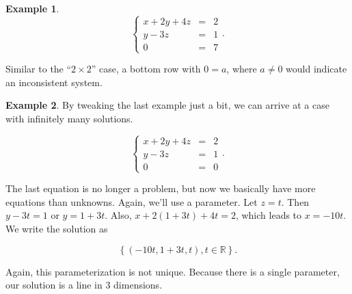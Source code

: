 \documentclass[
]{book}
\theoremstyle{definition}
\theoremstyle{definition}
\newtheorem{example}{Example}[chapter]
\theoremstyle{definition}
\theoremstyle{definition}
\theoremstyle{remark}
\begin{document}
\begin{examplebox}

\begin{example}
\begin{equation*}
    \left\{
    \begin{array}{rcl}
    x+2y+4z&=&2\\
    y-3z&=&1\\ 
    0&=&7
    \end{array} \right. .
\end{equation*}

Similar to the ``\(2\times 2\)'' case, a bottom row with \(0=a\), where \(a\neq 0\) would indicate an inconsistent system.
\end{example}

\end{examplebox}

\begin{examplebox}

\begin{example}
By tweaking the last example just a bit, we can arrive at a case with infinitely many solutions.

\begin{equation*}
    \left\{
    \begin{array}{rcl}
    x+2y+4z&=&2\\
    y-3z&=&1\\ 
    0&=&0
    \end{array} \right. .
\end{equation*}

The last equation is no longer a problem, but now we basically have more equations than unknowns. Again, we'll use a parameter. Let \(z=t\). Then \(y-3t=1\) or \(y=1+3t\). Also, \(x+2(1+3t)+4t=2\), which leads to \(x=-10t\). We write the solution as

\[\left\{(-10t,1+3t,t),t\in\mathbb{R}\right\}.\]

Again, this parameterization is not unique. Because there is a single parameter, our solution is a line in 3 dimensions.
\end{example}

\end{examplebox}
\end{document}
